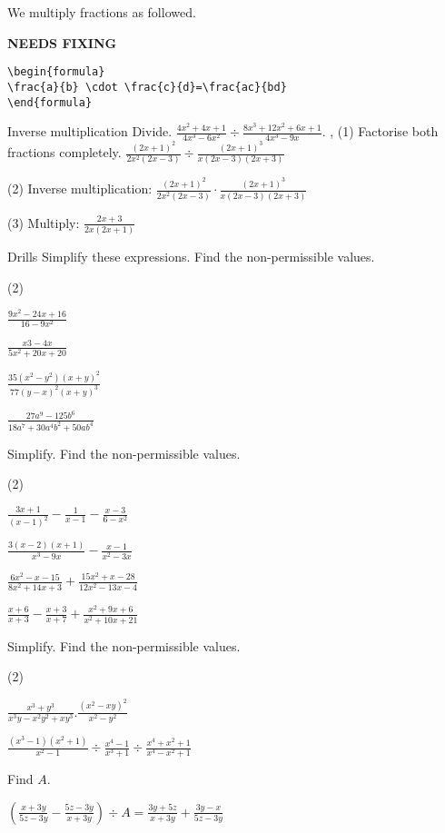 \documentclass[../../main.tex]{subfiles}
\begin{document}
We multiply fractions as followed.

{\hfill\Large\bfseries NEEDS FIXING\hfill}
\begin{lstlisting}
\begin{formula}
\frac{a}{b} \cdot \frac{c}{d}=\frac{ac}{bd}
\end{formula}
 \end{lstlisting} %
\begin{example}{Inverse multiplication}
Divide.
$\frac{4x^{2}+4x+1}{4x^{3}-6x^{2}} \div \frac{8x^{3}+12x^{2}+6x+1}{4x^{3}-9x}$.
\sep
(1) Factorise both fractions completely.
$\frac{(2x+1)^{2}}{2x^{2}(2x-3)} \div \frac{(2x+1)^{3}}{x(2x-3)(2x+3)}$

(2) Inverse multiplication: $\frac{(2x+1)^{2}}{2x^{2}(2x-3)} \cdot \frac{(2x+1)^{3}}{x(2x-3)(2x+3)}$

(3) Multiply: $\frac{2x+3}{2x(2x+1)}$

\end{example}
\begin{questions}{Drills}
Simplify these expressions. Find the non-permissible values.
\begin{question_set}(2)
    \item $\frac{9x^{2}-24x+16}{16-9x^2}$
    \item $\frac{x{3}-4x}{5x^{2}+20x+20}$
    \item $\frac{35\left(x^{2}-y^{2}\right)(x+y)^{2}}{77(y-x)^{2}(x+y)^{3}}$
    \item $\frac{27a^{9}-125b^{6}}{18a^{7}+30a^{4}b^{2}+50ab^{4}}$
\end{question_set}

Simplify. Find the non-permissible values.
\begin{question_set}(2)
    \item $\frac{3x+1}{(x-1)^{2}}-\frac{1}{x-1}-\frac{x-3}{6-x^2}$
    \item $\frac{3(x-2)(x+1)}{x^{3}-9x}-\frac{x-1}{x^{2}-3x}$
    \item $\frac{6x^{2}-x-15}{8x^{2}+14x+3}+\frac{15x^{2}+x-28}{12x^{2}-13x-4}$
    \item $\frac{x+6}{x+3}-\frac{x+3}{x+7}+\frac{x^{2}+9x+6}{x^{2}+10x+21}$
\end{question_set}

Simplify. Find the non-permissible values.
\begin{question_set}(2)
    \item $\frac{x^{3}+y^{3}}{x^{3}y-x^{2}y^{2}+xy^{3}}.\frac{\left(x^{2}-xy\right)^{2}}{x^{2}-y^{2}}$
    \item $\frac{\left(x^{3}-1\right)\left(x^{2}+1\right)}{x^{2}-1} \div \frac{x^{4}-1}{x^{3}+1} \div \frac{x^{4}+x^{2}+1}{x^{4}-x^{2}+1}$ %
\end{question_set}

Find $A$.

$\left(\frac{x+3y}{5z-3y}-\frac{5z-3y}{x+3y}\right) \div A=\frac{3y+5z}{x+3y}+\frac{3y-x}{5z-3y}$
\end{questions}
\end{document}
